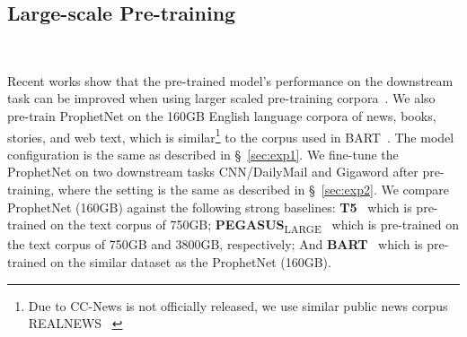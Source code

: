 \documentclass[11pt,a4paper]{article}
\begin{document}
\subsection{Large-scale Pre-training}~\label{sec:exp4}






Recent works show that the pre-trained model's performance on the downstream task can be improved when using larger scaled pre-training corpora~\cite{lewis2019bart, raffel2019exploring}. 
We also pre-train ProphetNet on the 160GB English language corpora of news, books, stories, and web text, which is similar\footnote{Due to CC-News is not officially released, we use similar public news corpus REALNEWS ~\cite{zellers2019defending}} to the corpus used in BART~\cite{lewis2019bart}.
The model configuration is the same as described in \S~\ref{sec:exp1}.
We fine-tune the ProphetNet on two downstream tasks CNN/DailyMail and Gigaword after pre-training, where the setting is the same as described in \S~\ref{sec:exp2}. 
We compare ProphetNet (160GB) against the following strong baselines: \textbf{T5}~\cite{raffel2019exploring} which is pre-trained on the text corpus of 750GB; \textbf{PEGASUS}\textsubscript{LARGE}~\cite{zhang2019pegasus} which is pre-trained on the text corpus of 750GB and 3800GB, respectively; And \textbf{BART}~\cite{lewis2019bart} which is pre-trained on the similar dataset as the ProphetNet (160GB).
\end{document}
